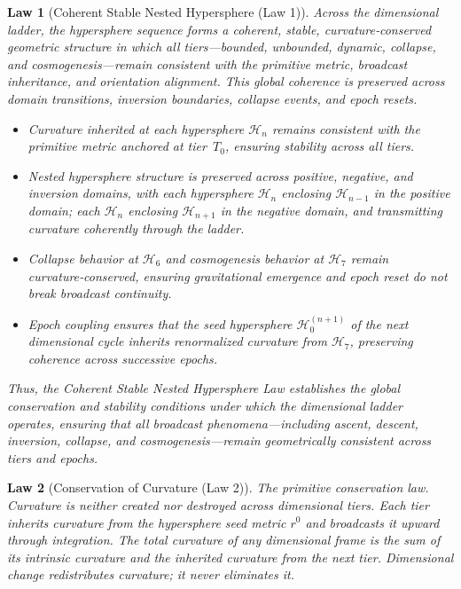 \documentclass[final,onefignum,onetabnum]{siamart}
\newtheorem{law}{Law}
\begin{document}
\begin{law}[Coherent Stable Nested Hypersphere (Law 1)]
Across the dimensional ladder, the hypersphere sequence forms a coherent, stable, curvature‑conserved geometric structure in which all tiers—bounded, unbounded, dynamic, collapse, and cosmogenesis—remain consistent with the primitive metric, broadcast inheritance, and orientation alignment. This global coherence is preserved across domain transitions, inversion boundaries, collapse events, and epoch resets.

\begin{itemize}
  \item Curvature inherited at each hypersphere $\mathcal{H}_{n}$ remains consistent with the primitive metric anchored at tier~$T_{0}$, ensuring stability across all tiers.
  \item Nested hypersphere structure is preserved across positive, negative, and inversion domains, with each hypersphere $\mathcal{H}_{n}$ enclosing $\mathcal{H}_{n-1}$ in the positive domain; each $\mathcal{H}_{n}$ enclosing $\mathcal{H}_{n+1}$ in the negative domain, and transmitting curvature coherently through the ladder.
  \item Collapse behavior at $\mathcal{H}_{6}$ and cosmogenesis behavior at $\mathcal{H}_{7}$ remain curvature‑conserved, ensuring gravitational emergence and epoch reset do not break broadcast continuity.
  \item Epoch coupling ensures that the seed hypersphere $\mathcal{H}_{0}^{(n+1)}$ of the next dimensional cycle inherits renormalized curvature from $\mathcal{H}_{7}$, preserving coherence across successive epochs.
\end{itemize}

Thus, the Coherent Stable Nested Hypersphere Law establishes the global conservation and stability conditions under which the dimensional ladder operates, ensuring that all broadcast phenomena—including ascent, descent, inversion, collapse, and cosmogenesis—remain geometrically consistent across tiers and epochs.
\end{law}

\begin{law}[Conservation of Curvature (Law 2)]
The primitive conservation law. Curvature is neither created nor destroyed across dimensional tiers. Each tier inherits curvature from the hypersphere seed metric $r^0$ and broadcasts it upward through integration. The total curvature of any dimensional frame is the sum of its intrinsic curvature and the inherited curvature from the next tier. Dimensional change redistributes curvature; it never eliminates it.
\end{law}
\end{document}
